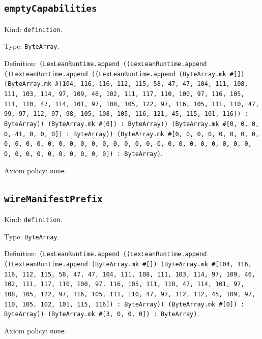 \documentclass[11pt]{article}
\begin{document}
\subsection*{\texttt{emptyCapabilities}}
\noindent Kind: \texttt{definition}.\par
\noindent Type: \texttt{ByteArray}.\par
\noindent Definition: \texttt{(LexLeanRuntime.append ((LexLeanRuntime.append ((LexLeanRuntime.append ((LexLeanRuntime.append (ByteArray.mk \#[]) (ByteArray.mk \#[104, 116, 116, 112, 115, 58, 47, 47, 104, 111, 108, 111, 103, 114, 97, 109, 46, 102, 111, 117, 110, 100, 97, 116, 105, 111, 110, 47, 114, 101, 97, 108, 105, 122, 97, 116, 105, 111, 110, 47, 99, 97, 112, 97, 98, 105, 108, 105, 116, 121, 45, 115, 101, 116]) : ByteArray)) (ByteArray.mk \#[0]) : ByteArray)) (ByteArray.mk \#[0, 0, 0, 0, 41, 0, 0, 0]) : ByteArray)) (ByteArray.mk \#[0, 0, 0, 0, 0, 0, 0, 0, 0, 0, 0, 0, 0, 0, 0, 0, 0, 0, 0, 0, 0, 0, 0, 0, 0, 0, 0, 0, 0, 0, 0, 0, 0, 0, 0, 0, 0, 0, 0, 0, 0]) : ByteArray)}.\par
\noindent Axiom policy: \texttt{none}.\par
\subsection*{\texttt{wireManifestPrefix}}
\noindent Kind: \texttt{definition}.\par
\noindent Type: \texttt{ByteArray}.\par
\noindent Definition: \texttt{(LexLeanRuntime.append ((LexLeanRuntime.append ((LexLeanRuntime.append (ByteArray.mk \#[]) (ByteArray.mk \#[104, 116, 116, 112, 115, 58, 47, 47, 104, 111, 108, 111, 103, 114, 97, 109, 46, 102, 111, 117, 110, 100, 97, 116, 105, 111, 110, 47, 114, 101, 97, 108, 105, 122, 97, 116, 105, 111, 110, 47, 97, 112, 112, 45, 109, 97, 110, 105, 102, 101, 115, 116]) : ByteArray)) (ByteArray.mk \#[0]) : ByteArray)) (ByteArray.mk \#[3, 0, 0, 0]) : ByteArray)}.\par
\noindent Axiom policy: \texttt{none}.\par
\end{document}
